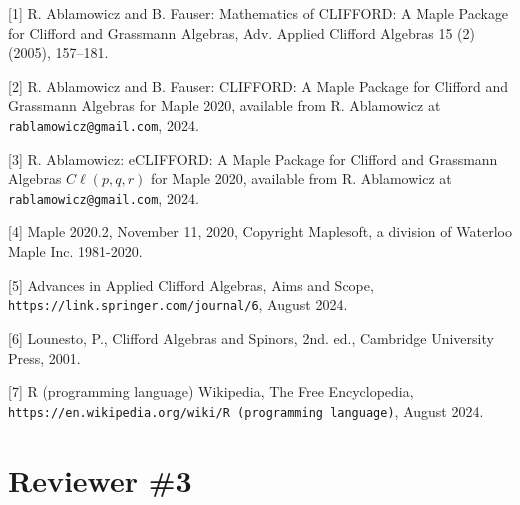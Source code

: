 \documentclass{article}
\newcommand{\cliff}[1]{\ensuremath{C\ell\left(#1\right)}}
\begin{document}
\begin{description}
\item{[1]} R. Ablamowicz and B. Fauser: Mathematics of CLIFFORD: A Maple Package for Clifford and
Grassmann Algebras, Adv. Applied Clifford Algebras 15 (2) (2005), 157–181.\\
\item{[2]} R. Ablamowicz and B. Fauser: CLIFFORD: A Maple Package for Clifford and Grassmann
Algebras for Maple 2020, available from R. Ablamowicz at {\tt rablamowicz@gmail.com}, 2024.\\
\item{[3]} R. Ablamowicz: eCLIFFORD: A Maple Package for Clifford and Grassmann Algebras \cliff{p, q, r}
for Maple 2020, available from R. Ablamowicz at {\tt rablamowicz@gmail.com}, 2024.\\
\item{[4]} Maple 2020.2, November 11, 2020, Copyright Maplesoft, a division of Waterloo Maple Inc.
1981-2020.\\
\item{[5]} Advances in Applied Clifford Algebras, Aims and Scope,
{\tt https://link.springer.com/journal/6}, August 2024.\\
\item{[6]} Lounesto, P., Clifford Algebras and Spinors, 2nd. ed., Cambridge University Press, 2001.
\item{[7]} R (programming language) Wikipedia, The Free Encyclopedia,
{\tt https://en.wikipedia.org/wiki/R (programming language)}, August 2024.
\end{description}


\section*{Reviewer \#3}
\end{document}
